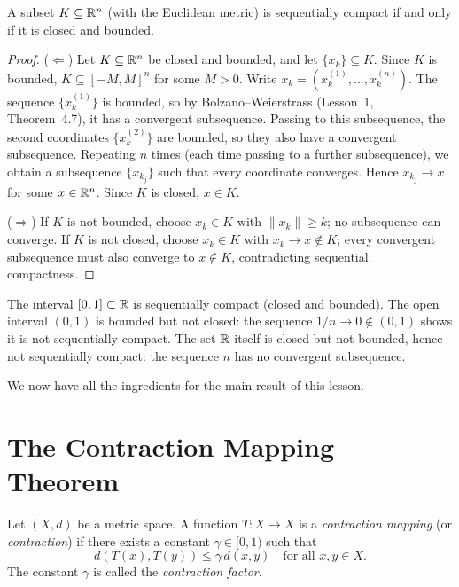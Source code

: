 \documentclass[11pt,a4paper]{article}
\begin{document}
\begin{theorem}
\label{thm:heine_borel}
A subset $K \subseteq \mathbb{R}^n$ (with the Euclidean metric) is sequentially
compact if and only if it is closed and bounded.
\end{theorem}

\begin{proof}
($\Leftarrow$) Let $K \subseteq \mathbb{R}^n$ be closed and bounded, and let
$\{x_k\} \subseteq K$. Since $K$ is bounded, $K \subseteq [-M, M]^n$
for some $M > 0$. Write $x_k = (x_k^{(1)}, \ldots, x_k^{(n)})$. The
sequence $\{x_k^{(1)}\}$ is bounded, so by Bolzano--Weierstrass
(Lesson~1, Theorem~4.7), it has a convergent subsequence. Passing to
this subsequence, the second coordinates $\{x_k^{(2)}\}$ are bounded,
so they also have a convergent subsequence. Repeating $n$ times (each
time passing to a further subsequence), we obtain a subsequence
$\{x_{k_j}\}$ such that every coordinate converges. Hence
$x_{k_j} \to x$ for some $x \in \mathbb{R}^n$. Since $K$ is closed,
$x \in K$.

($\Rightarrow$) If $K$ is not bounded, choose $x_k \in K$ with
$\|x_k\| \ge k$; no subsequence can converge. If $K$ is not closed,
choose $x_k \in K$ with $x_k \to x \notin K$; every convergent
subsequence must also converge to $x \notin K$, contradicting
sequential compactness.
\end{proof}

\begin{example}
\label{ex:compact_interval}
The interval $[0, 1] \subset \mathbb{R}$ is sequentially compact (closed and
bounded). The open interval $(0, 1)$ is bounded but not closed: the
sequence $1/n \to 0 \notin (0,1)$ shows it is not sequentially compact.
The set $\mathbb{R}$ itself is closed but not bounded, hence not sequentially
compact: the sequence $n$ has no convergent subsequence.
\end{example}

We now have all the ingredients for the main result of this lesson.

\section{The Contraction Mapping Theorem}
\label{sec:contraction}

\begin{definition}
\label{def:contraction}
Let $(X, d)$ be a metric space. A function $T \colon X \to X$ is a
\emph{contraction mapping} (or \emph{contraction}) if there exists a
constant $\gamma \in [0, 1)$ such that
\[
  d(T(x), T(y)) \le \gamma\, d(x, y) \quad \text{for all } x, y \in X.
\]
The constant $\gamma$ is called the \emph{contraction factor}.
\end{definition}
\end{document}

